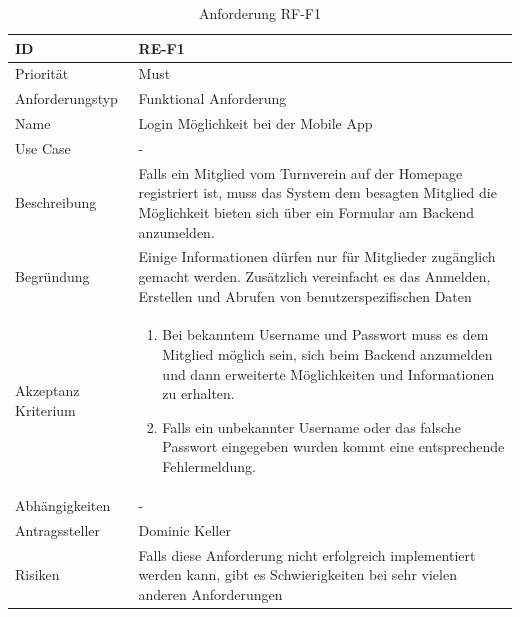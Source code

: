\begin{table}[ht]
\centering
  \begin{tabular}{ l | p{8cm} }
	\hline
	\rowcolor{gray}
	ID 			&	\textbf{RE-F1}\\ \hline
	Priorität 		&	Must\\ \hline
	Anforderungstyp	&	Funktional Anforderung\\ \hline
	Name 			&	Login Möglichkeit bei der Mobile App\\ \hline
	Use Case 		&	-\\ \hline
	Beschreibung 	&	Falls ein Mitglied vom Turnverein auf der Homepage registriert ist, muss das System dem besagten Mitglied die Möglichkeit bieten sich über ein Formular am Backend anzumelden.\\ \hline
	Begründung 		&	Einige Informationen dürfen nur für Mitglieder zugänglich
					gemacht werden. Zusätzlich vereinfacht es das Anmelden, Erstellen
					und Abrufen von benutzerspezifischen Daten\\ \hline
	Akzeptanz Kriterium	&	\begin{enumerate}
					\item Bei bekanntem Username und Passwort muss es dem Mitglied möglich sein, sich beim Backend anzumelden und dann erweiterte	Möglichkeiten und Informationen zu erhalten.
					\item Falls ein unbekannter Username oder das falsche Passwort eingegeben wurden kommt eine entsprechende Fehlermeldung.
					\end{enumerate}
					\\ \hline
	Abhängigkeiten 	&	-\\ \hline
	Antragssteller 	&	Dominic Keller\\ \hline
	Risiken	 	&	Falls diese Anforderung nicht erfolgreich implementiert werden kann, gibt es Schwierigkeiten bei sehr vielen anderen Anforderungen
  \end{tabular}
   \caption{Anforderung RF-F1}\label{table:req_1}
\end{table}

